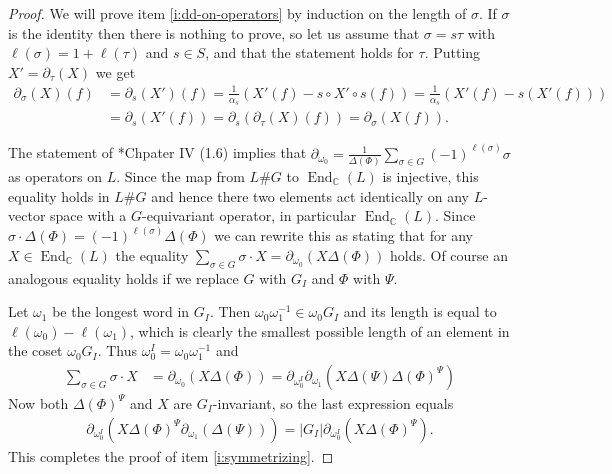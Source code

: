 \documentclass[11pt,fleqn]{article}
\newcommand\CC{\mathbb C}
\DeclareMathOperator\End{End}
\begin{document}
\begin{proof}
We will prove item \ref{i:dd-on-operators} by induction on the length of 
$\sigma$. If $\sigma$ is the identity then there is nothing to prove, so let
us assume that $\sigma = s \tau$ with $\ell(\sigma) = 1 + \ell(\tau)$ and 
$s \in S$, and that the statement holds for $\tau$. Putting $X' = 
\partial_\tau(X)$ we get
\begin{align*}
\partial_\sigma(X) (f)
	&= \partial_s(X')(f)
	= \frac{1}{\alpha_s} (X'(f) - s\circ X' \circ s (f)) 
	= \frac{1}{\alpha_s} (X'(f) - s(X'(f)))\\
	&= \partial_s(X'(f))
	= \partial_s(\partial_\tau(X)(f))
	= \partial_\sigma(X(f)).
\end{align*} 

The statement of \cite{Hiller-coxeter-book}*{Chpater IV (1.6)} implies that
$\partial_{\omega_0} = \frac{1}{\Delta(\Phi)} \sum_{\sigma \in G} 
(-1)^{\ell(\sigma)} \sigma$ as operators on $L$. Since the map from $L \# 
G$ to $\End_\CC(L)$ is injective, this equality holds in $L \# G$ and hence
there two elements act identically on any $L$-vector space with a 
$G$-equivariant operator, in particular $\End_\CC(L)$. Since $\sigma \cdot
\Delta(\Phi) = (-1)^{\ell(\sigma)} \Delta(\Phi)$ we can rewrite this as 
stating that for any $X \in \End_\CC(L)$ the equality $\sum_{\sigma \in G}
\sigma \cdot X = \partial_{\omega_0}(X \Delta(\Phi))$ holds. Of course
an analogous equality holds if we replace $G$ with $G_I$ and $\Phi$ with 
$\Psi$.

Let $\omega_1$ be the longest word in $G_I$. Then $\omega_0 \omega_1^{-1}
\in \omega_0 G_I$ and its length is equal to $\ell(\omega_0) - \ell(\omega_1)$,
which is clearly the smallest possible length of an element in the coset
$\omega_0 G_I$. Thus $\omega_0^I = \omega_0 \omega_1^{-1}$ and
\begin{align*}
\sum_{\sigma \in G} \sigma \cdot X 
	&=\partial_{\omega_0}(X \Delta(\Phi))
	= \partial_{\omega^I_0} \partial_{\omega_1}(X \Delta(\Psi) 
	\Delta(\Phi)^\Psi)
\end{align*}
Now both $\Delta(\Phi)^\Psi$ and $X$ are $G_I$-invariant, so the last 
expression equals
\begin{align*}
\partial_{\omega^I_0}(X \Delta(\Phi)^\Psi \partial_{\omega_1}(\Delta(\Psi)) )
= |G_I| \partial_{\omega^I_0}(X \Delta(\Phi)^\Psi).
\end{align*}
This completes the proof of item \ref{i:symmetrizing}.
\end{proof}
\end{document}
